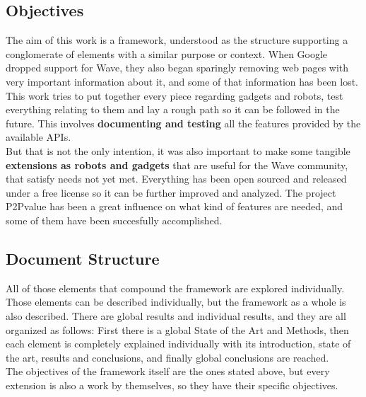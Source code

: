 \subsection{Objectives}
The aim of this work is a framework, understood as the structure supporting a conglomerate of elements with a similar purpose or context. When Google dropped support for Wave, they also began sparingly removing web pages with very important information about it, and some of that information has been lost. This work tries to put together every piece regarding gadgets and robots, test everything relating to them and lay a rough path so it can be followed in the future. This involves \textbf{documenting and testing} all the features provided by the available APIs.\\[.2cm]
But that is not the only intention, it was also important to make some tangible \textbf{extensions as robots and gadgets} that are useful for the Wave community, that satisfy needs not yet met. Everything has been open sourced and released under a free license \cite{ref:agpl} so it can be further improved and analyzed. The project P2Pvalue \cite{ref:p2pvalue} has been a great influence on what kind of features are needed, and some of them have been succesfully accomplished.

\subsection{Document Structure}
All of those elements that compound the framework are explored individually. Those elements can be described individually, but the framework as a whole is also described. There are global results and individual results, and they are all organized as follows: First there is a global State of the Art and Methods, then each element is completely explained individually with its introduction, state of the art, results and conclusions, and finally global conclusions are reached.\\[.2cm]
The objectives of the framework itself are the ones stated above, but every extension is also a work by themselves, so they have their specific objectives.

